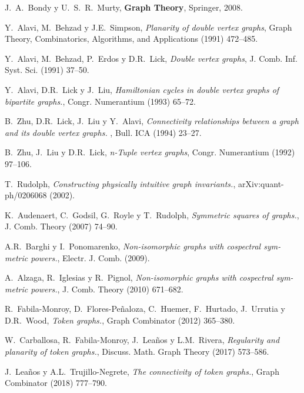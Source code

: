 \begin{thebibliography}{99}

  J.~A.~Bondy y U.~S.~R.~Murty,
  \textbf{Graph Theory},
  Springer, 2008.

  Y.~Alavi, M.~Behzad y J.E.~Simpson,
  \textit{Planarity of double vertex graphs},
  Graph Theory, Combinatorics, Algorithms, and Applications (1991) 472--485.

 Y.~Alavi, M.~Behzad, P.~Erdos y D.R.~Lick,
 \textit{Double vertex graphs},
 J. Comb. Inf. Syst. Sci. (1991) 37--50.

 Y.~Alavi, D.R.~Lick y J.~Liu,
 \textit{Hamiltonian cycles in double vertex graphs of bipartite graphs.},
 Congr. Numerantium (1993) 65--72.

  B.~Zhu, D.R.~Lick, J.~Liu y Y.~Alavi,
 \textit{Connectivity relationships between a graph and
 its double vertex graphs. },
 Bull. ICA (1994) 23--27.

  B.~Zhu, J.~Liu y D.R.~Lick,
 \textit{n-Tuple vertex graphs},
 Congr. Numerantium (1992) 97--106.

T.~Rudolph,
 \textit{Constructing physically intuitive graph invariants.},
 arXiv:quant-ph/0206068 (2002).

  K.~Audenaert, C.~Godsil, G.~Royle y T.~Rudolph,
  \textit{Symmetric squares of graphs.},
  J. Comb. Theory (2007) 74--90. 

  A.R.~Barghi y I.~Ponomarenko,
  \textit{Non-isomorphic graphs with cospectral sym-
  metric powers.},
  Electr. J. Comb. (2009). 

  A.~Alzaga, R.~Iglesias y  R.~Pignol,
  \textit{Non-isomorphic graphs with cospectral sym-
  metric powers.},
  J. Comb. Theory (2010) 671--682. 

  R.~Fabila-Monroy, D.~Flores-Pe\~{n}aloza, C.~Huemer, F.~Hurtado, J.~Urrutia y
D.R.~Wood,
  \textit{Token graphs.},
  Graph Combinator (2012) 365--380. 

  W.~Carballosa, R.~Fabila-Monroy, J.~Lea\~{n}os y L.M.~Rivera,
  \textit{Regularity and
  planarity of token graphs.},
  Discuss. Math. Graph Theory (2017) 573--586. 

  J.~Lea\~{n}os y A.L.~Trujillo-Negrete,
  \textit{The connectivity of token graphs.},
  Graph Combinator (2018) 777--790. 


\end{thebibliography}

